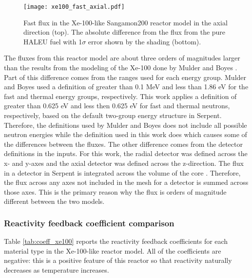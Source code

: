 \begin{figure}[ht]
        \centering 
        \texttt{[image: xe100\_fast\_axial.pdf]}
        \caption{Fast flux in the Xe-100-like Sangamon200 
        reactor model in the axial direction (top). The absolute 
        difference from the flux from 
        the pure \gls{HALEU} fuel with 1$\sigma$ error shown by 
        the shading (bottom).}
        \label{fig:xe100_fast_axial}
\end{figure}

The fluxes from this reactor model are about three orders of 
magnitudes larger than the results from the modeling of the 
Xe-100 done by Mulder and 
Boyes \cite{mulder_neutronics_2020}. Part of this difference comes 
from the ranges used for each energy group. Mulder and Boyes used 
a definition of greater than 0.1 MeV and less than 1.86 eV for the 
fast and thermal energy groups, respectively. This work applies a 
definition of greater than 0.625 eV and less then 0.625 eV for fast 
and thermal neutrons, respectively, based on the default two-group 
energy structure in Serpent. Therefore, the definitions used by 
Mulder and Boyes does not include all possible neutron energies 
while the definition used in this work does which causes some of the 
differences between the fluxes. 
The other difference  comes from the detector 
definitions in the inputs. For this work, the radial detector 
was defined across the x- and y-axes and the axial detector was defined 
across the z-direction. The flux in a detector in Serpent is integrated 
across the volume of the core \cite{leppanen_serpent_2013}. Therefore, 
the flux across any axes not included in the mesh for a detector is 
summed across those axes. This is the primary reason why the flux is 
orders of magnitude different between the two models. 

\subsubsection{Reactivity feedback coefficient comparison}
Table \ref{tab:coeff_xe100} reports the reactivity feedback 
coefficients for each material type in the Xe-100-like reactor model. 
All of the coefficients are negative: this is a positive feature of 
this reactor so that reactivity naturally decreases as temperature increases. 


